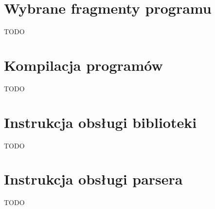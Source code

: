 \documentclass[00_main.tex]{subfiles}
\begin{document}
\appendix

\chapter{Wybrane fragmenty programu}

TODO

\chapter{Kompilacja programów}

TODO

\chapter{Instrukcja obsługi biblioteki}

TODO

\chapter{Instrukcja obsługi parsera}

TODO
\end{document}

